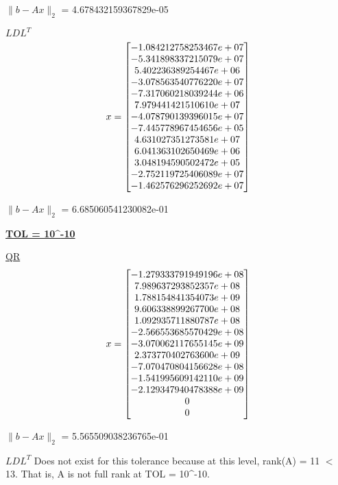 \documentclass[final,12pt,reqno]{amsart}
\begin{document}
$\|b-Ax\|_2$ = 4.678432159367829e-05

\underline{$LDL^T$}
\[
x =
\left[\begin{array}{@{}*{1}{c}@{}}
    -1.084212758253467e+07\\
    -5.341898337215079e+07\\
     5.402236389254467e+06\\
    -3.078563540776220e+07\\
    -7.317060218039244e+06\\
     7.979441421510610e+07\\
    -4.078790139396015e+07\\
    -7.445778967454656e+05\\
     4.631027351273581e+07\\
     6.041363102650469e+06\\
     3.048194590502472e+05\\
    -2.752119725406089e+07\\
    -1.462576296252692e+07
  \end{array} \right]
\]

$\|b-Ax\|_2$ = 6.685060541230082e-01

\newpage

\textbf{\underline{TOL = 10^{-10}}}

\underline{QR}
\[
x =
\left[\begin{array}{@{}*{1}{c}@{}}
    -1.279333791949196e+08\\
     7.989637293852357e+08\\
     1.788154841354073e+09\\
     9.606338899267700e+08\\
     1.092935711880787e+08\\
    -2.566553685570429e+08\\
    -3.070062117655145e+09\\
     2.373770402763600e+09\\
    -7.070470804156628e+08\\
    -1.541995609142110e+09\\
    -2.129347940478388e+09\\
                         0\\
                         0
  \end{array} \right]
\]

$\|b-Ax\|_2$ = 5.565509038236765e-01

\underline{$LDL^T$}
Does not exist for this tolerance because at this level, rank(A) = 11 $<$ 13. That is, A is not full rank at TOL = 10^{-10}.
\end{document}
